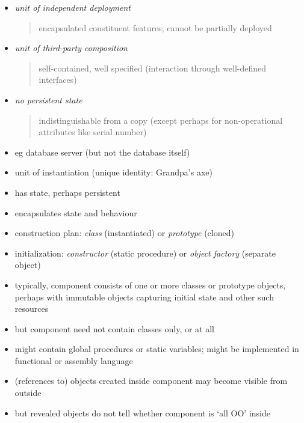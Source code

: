 \documentclass{sepslide-soa-faked} %
\begin{document}
\begin{slide}
\begin{itemize}
\item \emph{unit of independent deployment}
  \begin{quote}
  encapsulated constituent features; cannot be partially deployed
  \end{quote}
\item \emph{unit of third-party composition}
  \begin{quote}
  self-contained, well specified
  (interaction through well-defined interfaces)
  \end{quote}
\item \emph{no persistent state}
  \begin{quote}
  indistinguishable from a copy 
  (except perhaps for non-operational attributes like serial number)
  \end{quote}
\item eg database server (but not the database itself)
\end{itemize}
\end{slide}

\begin{slide}
\begin{itemize}
\item unit of instantiation (unique identity: Grandpa's axe)
\item has state, perhaps persistent
\item encapsulates state and behaviour
\item construction plan: \emph{class} (instantiated) or \emph{prototype} (cloned)
\item initialization: \emph{constructor} (static procedure) or \emph{object
factory} (separate object)
\end{itemize}
\end{slide}

\begin{slide}
\begin{itemize}
\item typically, component consists of one or more classes or prototype
objects, perhaps with immutable objects capturing initial state and other
such resources
\item but component need not contain classes only, or at all
\item might contain global procedures or static variables; might be
implemented in functional or assembly language
\item (references to) objects created inside component may become visible
from outside
\item but revealed objects do not tell whether component is `all OO' inside
\end{itemize}
\end{slide}
\end{document}
